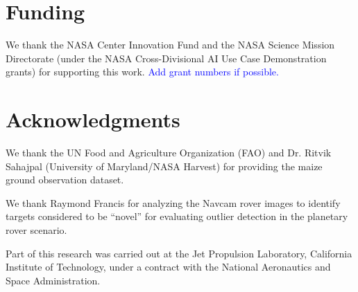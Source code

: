 \documentclass[utf8]{frontiersFPHY} %
\newcommand{\todo}[1]{\textcolor{blue}{#1}}
\begin{document}
\section*{Funding}
We thank the NASA Center Innovation Fund and the NASA Science Mission 
Directorate (under the NASA Cross-Divisional AI Use Case Demonstration grants)
 for supporting this work. \todo{Add grant numbers if possible.}

\section*{Acknowledgments}
We thank the UN Food and Agriculture Organization (FAO) and Dr. Ritvik Sahajpal
(University of Maryland/NASA Harvest) for providing the maize ground
 observation dataset.
 
 We thank Raymond Francis for analyzing the Navcam rover images to
identify targets considered to be ``novel'' for evaluating outlier
detection in the planetary rover scenario.

Part of this research was carried out at the Jet Propulsion
Laboratory, California Institute of Technology, under a contract with
the National Aeronautics and Space Administration.



\end{document}
